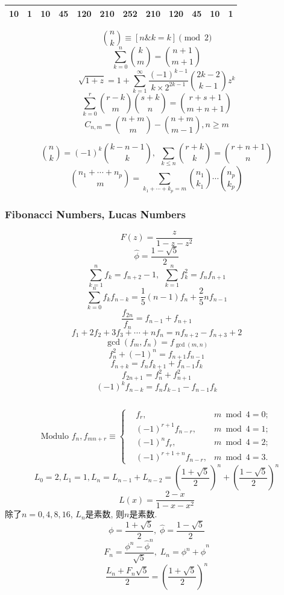 \begin{footnotesize}
\begin{multicols*}{2}
\begin{scriptsize}
\begin{tabular}{|P{0.2cm}|P{0.3cm}|P{0.3cm}|P{0.3cm}|P{0.3cm}|P{0.3cm}|P{0.3cm}|P{0.3cm}|P{0.3cm}|P{0.3cm}|P{0.3cm}|P{0.3cm}|}
	10 & 1 & 10 & 45 & 120 & 210 & 252 & 210 & 120 & 45 & 10 & 1\\
	\hline
\end{tabular}
\end{scriptsize}
\[ {n \choose k} \equiv [n\& k=k] \pmod 2 \]
\[ \sum_{k=0}^n{k \choose m} = {n+1 \choose m+1} \]
\[ \sqrt{1+z} = 1 + \sum_{k=1}^{\infty}\frac{(-1)^{k-1}}{k\times2^{2k-1}}{2k-2 \choose k-1}z^k \]
\[ \sum_{k=0}^{r}{r-k \choose m}{s+k \choose n} = {r+s+1 \choose m+n+1} \]
\[ C_{n, m} = {n+m \choose m} - {n+m \choose m-1}, n \geq m \]
\end{multicols*}
\[ {n \choose k} = (-1)^k{k-n-1 \choose k},\ \ \sum_{k \leq n}{r+k \choose k} = {r+n+1 \choose n} \]
\[ {{n_1+\cdots+n_p}\choose m}=\sum_{k_1+\cdots+k_p=m}{n_1\choose k_1}\cdots{n_p\choose k_p}\]
\subsubsection{Fibonacci Numbers, Lucas Numbers}
\begin{multicols*}{2}
\[ F(z) = \frac{z}{1-z-z^2} \]
\[ \hat{\phi} = \frac{1-\sqrt{5}}{2} \]
\[ \sum_{k=1}^nf_k = f_{n+2}-1,\ \ \sum_{k=1}^nf^2_k = f_nf_{n+1} \]
\[ \sum_{k=0}^nf_kf_{n-k} = \frac{1}{5}(n-1)f_n+\frac{2}{5}nf_{n-1} \]
\[ \frac{f_{2n}}{f_n} = f_{n-1} + f_{n+1}\]
\[ f_1+2f_2+3f_3+\cdots+nf_n=nf_{n+2}-f_{n+3}+2\]
\[ \gcd(f_m,f_n)=f_{\gcd(m,n)}\]
\[ f^2_n + (-1)^n = f_{n+1}f_{n-1} \]
\[ f_{n+k} = f_nf_{k+1} + f_{n-1}f_k \]
\[ f_{2n+1} = f^2_n+f^2_{n+1} \]
\[ (-1)^kf_{n-k} = f_{n}f_{k-1} - f_{n-1}f_{k} \]
\begin{small}
\inputminted{python3}{src/tbr/fib.py}
\end{small}
\end{multicols*}
\[ \text{Modulo }f_n, f_{mn+r} \equiv \left\{
\begin{aligned}
&f_r,& m \bmod 4 = 0; \\
&(-1)^{r+1}f_{n-r},& m \bmod 4 = 1; \\
&(-1)^nf_r,& m \bmod 4 = 2; \\
&(-1)^{r+1+n}f_{n-r},& m \bmod 4 = 3.
\end{aligned}
\right.
\]
\[ L_0=2,L_1=1,L_n=L_{n-1}+L_{n-2}=(\frac{1+\sqrt{5}}{2})^n+(\frac{1-\sqrt{5}}{2})^n \]
\[ L(x)=\frac{2-x}{1-x-x^2} \]
除了$n=0,4,8,16$, $L_n$是素数, 则$n$是素数.
$$\phi = \frac {1 + \sqrt 5} 2, \; \hat\phi = \frac {1 - \sqrt 5} 2$$
$$F_n = \frac {\phi^n - {\hat\phi} ^ n} {\sqrt 5}, \; L_n = \phi ^ n + {\hat\phi} ^ n$$
$$\frac {L_n + F_n \sqrt 5} 2 = \left( \frac {1 + \sqrt 5} 2 \right) ^ n$$


\end{footnotesize}
